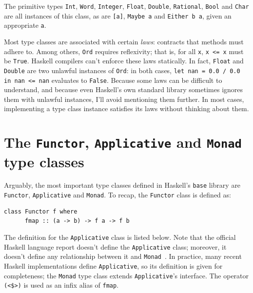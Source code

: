 \documentclass[UdineBachThesis,american,11pt]{PhdThesis}
\begin{document}
  The primitive types \mbox{\texttt{Int}}, \mbox{\texttt{Word}},
  \mbox{\texttt{Integer}}, \mbox{\texttt{Float}}, \mbox{\texttt{Double}},
  \mbox{\texttt{Rational}}, \mbox{\texttt{Bool}} and \mbox{\texttt{Char}} are
  all instances of this class, as are \mbox{\texttt{[a]}},
  \mbox{\texttt{Maybe a}} and \mbox{\texttt{Either b a}}, given an appropriate
  \texttt{a}.

  Most type classes are associated with certain \emph{laws}: contracts that
  methods must adhere to. Among others, \mbox{\texttt{Ord}} requires
  reflexivity; that is, for all \texttt{x}, \mbox{\texttt{x <= x}} must be
  \mbox{\texttt{True}}. Haskell compilers can't enforce these laws statically.
  In fact, \mbox{\texttt{Float}} and \mbox{\texttt{Double}} are two unlawful
  instances of \mbox{\texttt{Ord}}: in both cases,
  \mbox{\texttt{let nan = 0.0 / 0.0 in nan <= nan}} evaluates to
  \mbox{\texttt{False}}. Because some laws can be difficult to understand, and
  because even Haskell's own standard library sometimes ignores them with
  unlawful instances, I'll avoid mentioning them further. In most cases,
  implementing a type class instance satisfies its laws without thinking about
  them.

  \section{The \texttt{Functor}, \texttt{Applicative} and \texttt{Monad} type classes}

  Arguably, the most important type classes defined in Haskell's
  \mbox{\texttt{base}} library are \mbox{\texttt{Functor}},
  \mbox{\texttt{Applicative}} and \mbox{\texttt{Monad}}. To recap, the
  \mbox{\texttt{Functor}} class is defined as:

  \begin{Verbatim}[gobble=4,fontsize=\small]
    class Functor f where
      fmap :: (a -> b) -> f a -> f b
  \end{Verbatim}

  The definition for the \mbox{\texttt{Applicative}} class is listed below. Note
  that the official Haskell language report doesn't define the
  \mbox{\texttt{Applicative}} class; moreover, it doesn't define any
  relationship between it and
  \mbox{\texttt{Monad}}~\cite{haskell-functor-and-monad-classes}. In practice,
  many recent Haskell implementations define \mbox{\texttt{Applicative}}, so its
  definition is given for completeness; the \mbox{\texttt{Monad}} type class
  extends \mbox{\texttt{Applicative}}'s interface. The operator
  \mbox{\texttt{(<\$>)}} is used as an infix alias of \mbox{\texttt{fmap}}.
\end{document}
